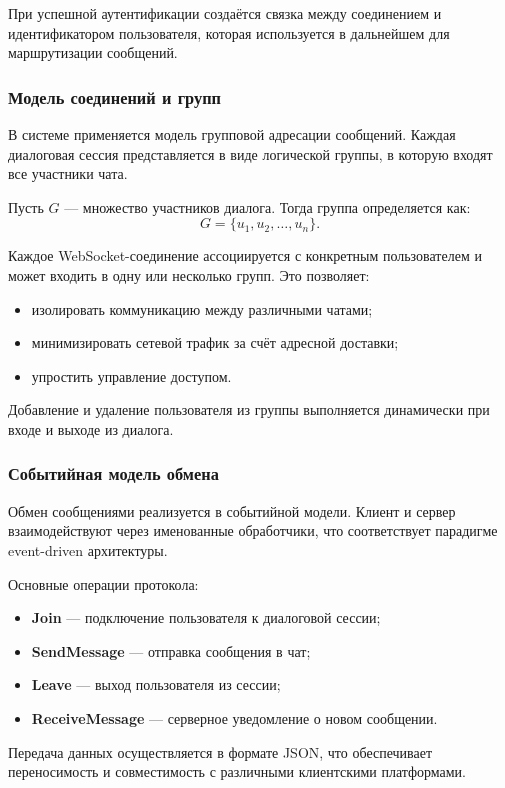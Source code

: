 \documentclass{article}
\begin{document}
При успешной аутентификации создаётся связка между соединением и идентификатором пользователя, которая используется в дальнейшем для маршрутизации сообщений.

\subsubsection{Модель соединений и групп}

В системе применяется модель групповой адресации сообщений. Каждая диалоговая сессия представляется в виде логической группы, в которую входят все участники чата.

Пусть $G$ — множество участников диалога. Тогда группа определяется как:
\[
G = \{u_1, u_2, \dots, u_n\}.
\]

Каждое WebSocket-соединение ассоциируется с конкретным пользователем и может входить в одну или несколько групп. Это позволяет:
\begin{itemize}
\item изолировать коммуникацию между различными чатами;
\item минимизировать сетевой трафик за счёт адресной доставки;
\item упростить управление доступом.
\end{itemize}

Добавление и удаление пользователя из группы выполняется динамически при входе и выходе из диалога.

\subsubsection{Событийная модель обмена}

Обмен сообщениями реализуется в событийной модели. Клиент и сервер взаимодействуют через именованные обработчики, что соответствует парадигме event-driven архитектуры.

Основные операции протокола:
\begin{itemize}
\item \textbf{Join} — подключение пользователя к диалоговой сессии;
\item \textbf{SendMessage} — отправка сообщения в чат;
\item \textbf{Leave} — выход пользователя из сессии;
\item \textbf{ReceiveMessage} — серверное уведомление о новом сообщении.
\end{itemize}

Передача данных осуществляется в формате JSON, что обеспечивает переносимость и совместимость с различными клиентскими платформами.
\end{document}
